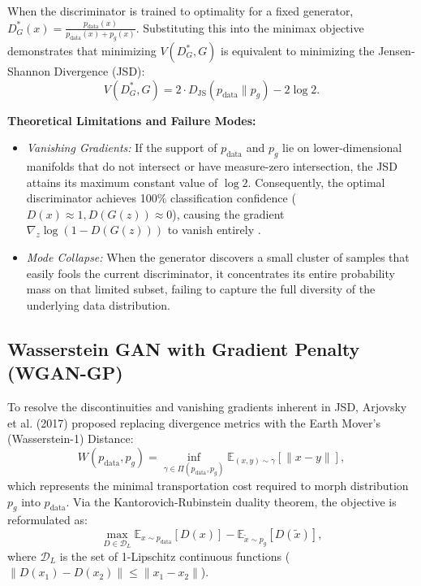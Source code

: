 \documentclass[11pt,letterpaper]{article}
\begin{document}
When the discriminator is trained to optimality for a fixed generator, $D^*_G(x) = \frac{p_{\text{data}}(x)}{p_{\text{data}}(x) + p_g(x)}$. Substituting this into the minimax objective demonstrates that minimizing $V(D^*_G, G)$ is equivalent to minimizing the Jensen-Shannon Divergence (JSD):
\begin{equation}
V(D^*_G, G) = 2 \cdot D_{\text{JS}}(p_{\text{data}} \parallel p_g) - 2 \log 2.
\end{equation}

\noindent\textbf{Theoretical Limitations and Failure Modes:}
\begin{itemize}
    \item \textit{Vanishing Gradients:} If the support of $p_{\text{data}}$ and $p_g$ lie on lower-dimensional manifolds that do not intersect or have measure-zero intersection, the JSD attains its maximum constant value of $\log 2$. Consequently, the optimal discriminator achieves 100\% classification confidence ($D(x) \approx 1, D(G(z)) \approx 0$), causing the gradient $\nabla_z \log(1 - D(G(z)))$ to vanish entirely \cite{arjovsky2017towards}.
    \item \textit{Mode Collapse:} When the generator discovers a small cluster of samples that easily fools the current discriminator, it concentrates its entire probability mass on that limited subset, failing to capture the full diversity of the underlying data distribution.
\end{itemize}

\subsection{Wasserstein GAN with Gradient Penalty (WGAN-GP)}
To resolve the discontinuities and vanishing gradients inherent in JSD, Arjovsky et al. (2017) \cite{arjovsky2017wgan} proposed replacing divergence metrics with the Earth Mover's (Wasserstein-1) Distance:
\begin{equation}
W(p_{\text{data}}, p_g) = \inf_{\gamma \in \Pi(p_{\text{data}}, p_g)} \mathbb{E}_{(x, y) \sim \gamma}[\|x - y\|],
\end{equation}
which represents the minimal transportation cost required to morph distribution $p_g$ into $p_{\text{data}}$. Via the Kantorovich-Rubinstein duality theorem, the objective is reformulated as:
\begin{equation}
\max_{D \in \mathcal{D}_L} \mathbb{E}_{x \sim p_{\text{data}}}[D(x)] - \mathbb{E}_{\tilde{x} \sim p_g}[D(\tilde{x})],
\end{equation}
where $\mathcal{D}_L$ is the set of 1-Lipschitz continuous functions ($\|D(x_1) - D(x_2)\| \le \|x_1 - x_2\|$).
\end{document}
